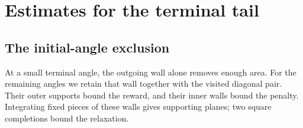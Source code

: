 \section{Estimates for the terminal tail}\label{app:partial-turn-estimates}

\subsection{The initial-angle exclusion}

At a small terminal angle, the outgoing wall alone removes enough
area. For the remaining angles we retain that wall together with the
visited diagonal pair. Their outer supports bound the reward, and
their inner walls bound the penalty. Integrating fixed pieces of these
walls gives supporting planes; two square completions bound the relaxation.


